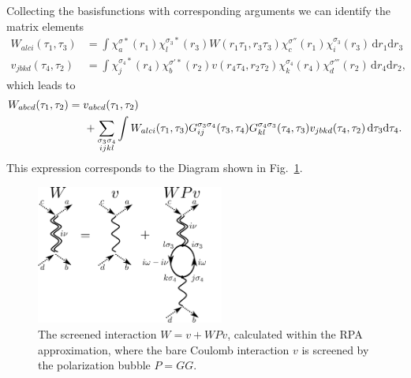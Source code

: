 \documentclass[12pt,a4paper]{scrartcl}
\numberwithin{equation}{section}
\begin{document}
Collecting the basisfunctions with corresponding arguments we can identify
the matrix elements
\begin{align}
 W_{alci}(\tau_1,\tau_3)
 &= \int \chi^{\sigma*}_a(r_1) \chi_{l}^{\sigma_3*}(r_3)
              W(r_1\tau_1,r_3\tau_3) 
         \chi^{\sigma''}_c(r_1) \chi_{i}^{\sigma_3}(r_3) \, \mathrm{d}r_1\mathrm{d}r_3 \\
%
v_{jbkd}(\tau_4,\tau_2)
 &= \int \chi_{j}^{\sigma_4*}(r_4) \chi^{\sigma'*}_b(r_2)
              v(r_4\tau_4,r_2\tau_2)
         \chi_{k}^{\sigma_4}(r_4) \chi^{\sigma'''}_d(r_2) \, \mathrm{d}r_4\mathrm{d}r_2,
\end{align}
which leads to 
\begin{align}
W_{abcd}(\tau_1,\tau_2) 
%
&= v_{abcd}(\tau_1,\tau_2)  \nonumber \\ 
& \hspace{0.5cm}  + \sum_{\substack{\sigma_3\sigma_4 \\ ijkl }}\int 
                     W_{alci}(\tau_1,\tau_3) 
                     G^{\sigma_3\sigma_4}_{ij}(\tau_3,\tau_4) G^{\sigma_4\sigma_3}_{kl}(\tau_4,\tau_3)
                     v_{jbkd}(\tau_4,\tau_2)
                    \, \mathrm{d}\tau_3\mathrm{d}\tau_4 .
%
\end{align}
This expression corresponds to the Diagram shown in Fig.~\ref{fig:w_rpa}.

\begin{figure}[t]
\begin{center}
\includegraphics[width=0.55\textwidth]{figs/rpa_diag.pdf}
\end{center}
\caption{The screened interaction $W=v+WPv$, calculated within the RPA approximation,
where the bare Coulomb interaction $v$ is screened by the polarization bubble
$P=GG$.}
\label{fig:w_rpa}
\end{figure}
\end{document}
